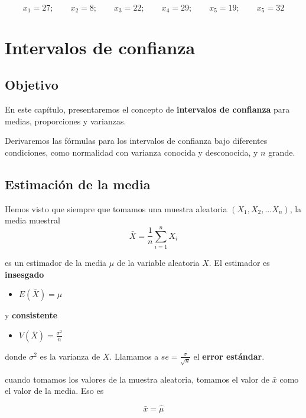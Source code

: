 \documentclass[
]{book}
\providecommand{\tightlist}{%
  \setlength{\itemsep}{0pt}\setlength{\parskip}{0pt}}
\begin{document}
\[x_1 = 27; \qquad   x_2 = 8; \qquad   x_3 = 22; \qquad   x_4 = 29; \qquad   x_5 = 19; \qquad   x_5 = 32\]

\hypertarget{intervalos-de-confianza}{%
\chapter{Intervalos de confianza}\label{intervalos-de-confianza}}

\hypertarget{objetivo-9}{%
\section{Objetivo}\label{objetivo-9}}

En este capítulo, presentaremos el concepto de \textbf{intervalos de confianza} para medias, proporciones y varianzas.

Derivaremos las fórmulas para los intervalos de confianza bajo diferentes condiciones, como normalidad con varianza conocida y desconocida, y \(n\) grande.

\hypertarget{estimaciuxf3n-de-la-media}{%
\section{Estimación de la media}\label{estimaciuxf3n-de-la-media}}

Hemos visto que siempre que tomamos una muestra aleatoria \((X_1, X_2, ... X_n)\), la media muestral
\[\bar{X}=\frac{1}{n}\sum_{i=1}^n X_i\]

es un estimador de la media \(\mu\) de la variable aleatoria \(X\). El estimador es \textbf{insesgado}

\begin{itemize}
\tightlist
\item
  \(E(\bar{X})=\mu\)
\end{itemize}

y \textbf{consistente}

\begin{itemize}
\tightlist
\item
  \(V(\bar{X})=\frac{\sigma^2}{n}\)
\end{itemize}

donde \(\sigma^2\) es la varianza de \(X\). Llamamos a \(se=\frac{\sigma}{\sqrt{n}}\) el \textbf{error estándar}.

cuando tomamos los valores de la muestra aleatoria, tomamos el valor de \(\bar{x}\) como el valor de la media. Eso es

\[\bar{x}=\hat{\mu}\]
\end{document}
